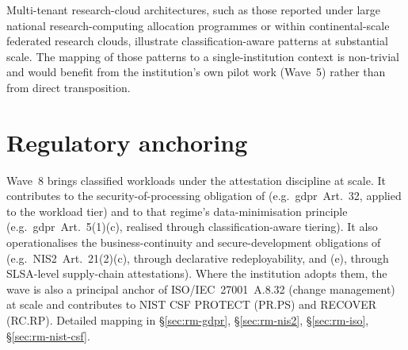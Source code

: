 \begin{realworldbox}
\noindent Multi-tenant research-cloud architectures, such as
those reported under large national research-computing
allocation programmes or within continental-scale federated
research clouds, illustrate
classification-aware patterns at substantial scale. The mapping
of those patterns to a single-institution context is non-trivial
and would benefit from the institution's own pilot work
(Wave~5) rather than from direct transposition.
\end{realworldbox}

\section{Regulatory anchoring}
\label{sec:w8-regulatory}

\noindent Wave~8 brings classified workloads under the
attestation discipline at scale. It contributes to the
security-of-processing obligation of 
(e.g.\ \gls{gdpr}~Art.~32, applied to the workload
tier) and to that regime's data-minimisation principle (e.g.\
\gls{gdpr}~Art.~5(1)(c), realised through classification-aware
tiering). It also operationalises the business-continuity and
secure-development obligations of 
(e.g.\ NIS2~Art.~21(2)(c), through declarative
redeployability, and (e), through SLSA-level supply-chain
attestations). Where the institution adopts them, the wave is also
a principal anchor of ISO/IEC~27001~A.8.32 (change
management) at scale and contributes to NIST CSF \textsf{PROTECT}
(PR.PS) and \textsf{RECOVER} (RC.RP). Detailed mapping in
 \S\ref{sec:rm-gdpr},
\S\ref{sec:rm-nis2}, \S\ref{sec:rm-iso},
\S\ref{sec:rm-nist-csf}.
